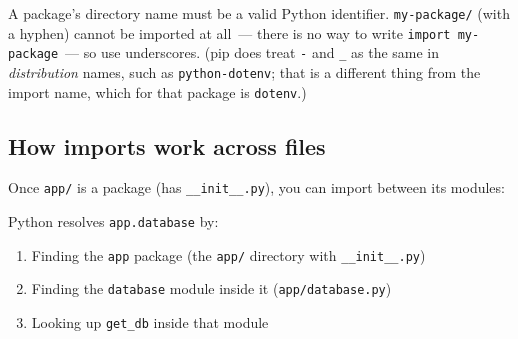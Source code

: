 \begin{codebox}[short]

\begin{Shaded}
\begin{Highlighting}[]
\end{Highlighting}
\end{Shaded}

\end{codebox}

\noindent{}A package's directory name must be a valid Python identifier. \texttt{my-package/} (with a hyphen) cannot be imported at all~--- there is no way to write \texttt{import\ my-package}~--- so use underscores. (pip does treat \texttt{-} and \texttt{\_} as the same in \emph{distribution} names, such as \texttt{python-dotenv}; that is a different thing from the import name, which for that package is \texttt{dotenv}.)

\subsection*{How imports work across files}\label{15-structuring-the-application:how-imports-work-across-files}

Once \texttt{app/} is a package (has \texttt{\_\_init\_\_.py}), you can import between its modules:

\begin{codebox}[short]

\begin{Shaded}
\begin{Highlighting}[]
\end{Highlighting}
\end{Shaded}

\end{codebox}

\noindent{}Python resolves \texttt{app.database} by:

\begin{enumerate}
\def\labelenumi{\arabic{enumi}.}
\tightlist
\item
  Finding the \texttt{app} package (the \texttt{app/} directory with \texttt{\_\_init\_\_.py})
\item
  Finding the \texttt{database} module inside it (\texttt{app/database.py})
\item
  Looking up \texttt{get\_db} inside that module
\end{enumerate}

